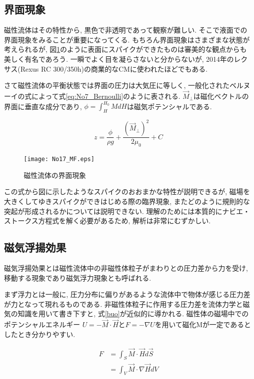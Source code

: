 \documentclass[b5,twocolumn,11pt]{jarticle}
\begin{document}
  \subsection{界面現象}
磁性流体はその特性から, 黒色で非透明であって観察が難しい. そこで液面での界面現象をみることが重要になってくる. もちろん界面現象はさまざまな状態が考えられるが, 図\ref{fig:MF}のように表面にスパイクができたものは審美的な観点からも美しく有名であろう. 一瞬でよく目を凝らさないと分からないが, 2014年のレクサス(Rexus RC 300/350h)の商業的なCMに使われたほどでもある. \par
さて磁性流体の平衡状態では界面の圧力は大気圧に等しく, 一般化されたベルヌーイの式によって式\ref{eq:No7_Bernoulli}のように表される. $\vec{M}_{\perp}$は磁化ベクトルの界面に垂直な成分であり, $\phi = \int_{H}^{H_0} M dH $は磁気ポテンシャルである. 

    \begin{equation}
      z = \frac{\phi}{\rho g} + \frac{(\vec{M}_{\perp})^2}{2\mu_0} + C \label{eq:No7_Bernoulli}
    \end{equation}

\begin{figure}
\begin{center}
\texttt{[image: No17\_MF.eps]}\\
\end{center}
\caption{磁性流体の界面現象}
\label{fig:MF}
\end{figure}


この式から図に示したようなスパイクのおおまかな特性が説明できるが, 磁場を大きくしてゆきスパイクができはじめる際の臨界現象, またどのように規則的な突起が形成されるかについては説明できない. 理解のためには本質的にナビエ・ストークス方程式を解く必要があるため, 解析は非常にむずかしい. 

  \subsection{磁気浮揚効果}	
磁気浮揚効果とは磁性流体中の非磁性体粒子がまわりとの圧力差から力を受け, 移動する現象であり磁気浮力現象とも呼ばれる. \par
まず浮力とは一般に, 圧力分布に偏りがあるような流体中で物体が感じる圧力差が力となって現れるものである. 非磁性体粒子に作用する圧力差を流体力学と磁気の知識を用いて書き下すと, 式\ref{buo}が近似的に導かれる. 磁性体の磁場中でのポテンシャルエネルギー $U=- \vec{M} \cdot \vec{H}$と$F=-\nabla U$を用いて磁化Mが一定であるとしたとき分かりやすい. 

    \begin{align}
      F & = \int_S \vec{M} \cdot \vec{H} d\vec{S} \nonumber \\
        & = \int_V \vec{M} \cdot \nabla \vec{H} dV \label{buo}
    \end{align}
\end{document}
